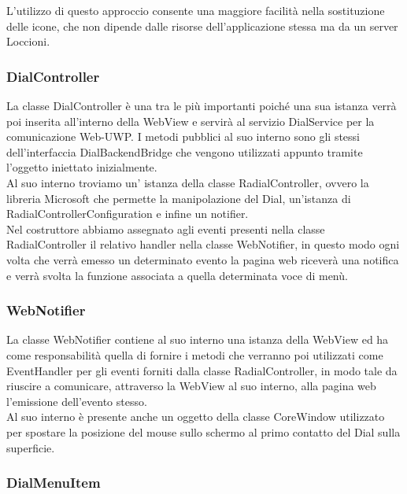 L’utilizzo di questo approccio consente una maggiore facilità nella sostituzione delle icone, che non dipende dalle risorse dell’applicazione stessa ma da un server Loccioni.

\subsubsection{DialController}

La classe DialController è una tra le più importanti poiché una sua istanza verrà poi inserita all’interno della WebView e servirà al servizio DialService per la comunicazione Web-UWP. I metodi pubblici al suo interno sono gli stessi dell’interfaccia DialBackendBridge che vengono utilizzati appunto tramite l’oggetto iniettato inizialmente.\\

Al suo interno troviamo un’ istanza della classe RadialController, ovvero la libreria Microsoft che permette la manipolazione del Dial, un'istanza di RadialControllerConfiguration e infine un notifier.\\

Nel costruttore abbiamo assegnato agli eventi presenti nella classe RadialController il relativo handler nella classe WebNotifier, in questo modo ogni volta che verrà emesso un determinato evento la pagina web riceverà una notifica e verrà svolta la funzione associata a quella determinata voce di menù.

\subsubsection{WebNotifier}

La classe WebNotifier contiene al suo interno una istanza della WebView ed ha come responsabilità quella di fornire i metodi che verranno poi utilizzati come EventHandler per gli eventi forniti dalla classe RadialController, in modo tale da riuscire a comunicare, attraverso la WebView al suo interno, alla pagina web l’emissione dell’evento stesso.\\

Al suo interno è presente anche un oggetto della classe CoreWindow utilizzato per spostare la posizione del mouse sullo schermo al primo contatto del Dial sulla superficie.

\subsubsection{DialMenuItem}

